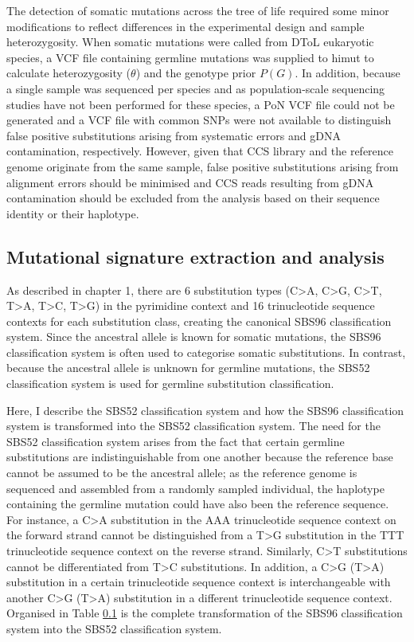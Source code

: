 The detection of somatic mutations across the tree of life required some minor modifications to reflect differences in the experimental design and sample heterozygosity. When somatic mutations were called from DToL eukaryotic species, a VCF file containing germline mutations was supplied to himut to calculate heterozygosity ($\theta$) and the genotype prior $P(G)$. In addition, because a single sample was sequenced per species and as population-scale sequencing studies have not been performed for these species, a PoN VCF file could not be generated and a VCF file with common SNPs were not available to distinguish false positive substitutions arising from systematic errors and gDNA contamination, respectively. However, given that CCS library and the reference genome originate from the same sample, false positive substitutions arising from alignment errors should be minimised and CCS reads resulting from gDNA contamination should be excluded from the analysis based on their sequence identity or their haplotype.

\subsection{Mutational signature extraction and analysis}

As described in chapter 1, there are 6 substitution types (C>A, C>G, C>T, T>A, T>C, T>G) in the pyrimidine context and 16 trinucleotide sequence contexts for each substitution class, creating the canonical SBS96 classification system. Since the ancestral allele is known for somatic mutations, the SBS96 classification system is often used to categorise somatic substitutions. In contrast, because the ancestral allele is unknown for germline mutations, the SBS52 classification system is used for germline substitution classification. 

Here, I describe the SBS52 classification system and how the SBS96 classification system is transformed into the SBS52 classification system. The need for the SBS52 classification system arises from the fact that certain germline substitutions are indistinguishable from one another because the reference base cannot be assumed to be the ancestral allele; as the reference genome is sequenced and assembled from a randomly sampled individual, the haplotype containing the germline mutation could have also been the reference sequence. For instance, a C>A substitution in the AAA trinucleotide sequence context on the forward strand cannot be distinguished from a T>G substitution in the TTT trinucleotide sequence context on the reverse strand. Similarly, C>T substitutions cannot be differentiated from T>C substitutions. In addition, a C>G (T>A) substitution in a certain trinucleotide sequence context is interchangeable with another C>G (T>A) substitution in a different trinucleotide sequence context. Organised in Table \ref{} is the complete transformation of the SBS96 classification system into the SBS52 classification system. 

